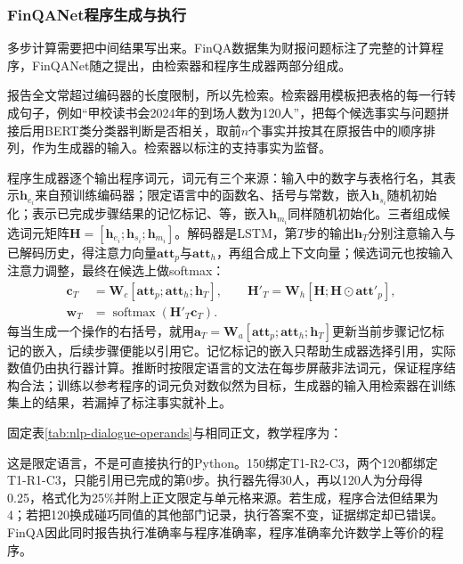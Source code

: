 \subsubsection{FinQANet程序生成与执行}
\label{sec:nlp-dialogue-finqa}

多步计算需要把中间结果写出来。FinQA数据集为财报问题标注了完整的计算程序，FinQANet随之提出，由检索器和程序生成器两部分组成。

报告全文常超过编码器的长度限制，所以先检索。检索器用模板把表格的每一行转成句子，例如“甲校读书会2024年的到场人数为120人”，把每个候选事实与问题拼接后用BERT类分类器判断是否相关，取前$n$个事实并按其在原报告中的顺序排列，作为生成器的输入。检索器以标注的支持事实为监督。

程序生成器逐个输出程序词元，词元有三个来源：输入中的数字与表格行名，其表示$\bm h_{e_i}$来自预训练编码器；限定语言中的函数名、括号与常数，嵌入$\bm h_{s_i}$随机初始化；表示已完成步骤结果的记忆标记、等，嵌入$\bm h_{m_i}$同样随机初始化。三者组成候选词元矩阵$\bm H=[\bm h_{e_i};\bm h_{s_i};\bm h_{m_i}]$。解码器是LSTM，第$T$步的输出$\bm h_T$分别注意输入与已解码历史，得注意力向量$\bm{att}_p$与$\bm{att}_h$，再组合成上下文向量；候选词元也按输入注意力调整，最终在候选上做softmax：
\begin{equation}
\begin{aligned}
  \bm c_T&=\bm W_c[\bm{att}_p;\bm{att}_h;\bm h_T],\qquad
  \bm H'_T=\bm W_h[\bm H;\bm H\odot\bm{att}'_p],\\
  \bm w_T&=\operatorname{softmax}(\bm H'_T\bm c_T).
\end{aligned}
  \label{eq:nlp-dialogue-finqa}
\end{equation}
每当生成一个操作的右括号，就用$\bm a_T=\bm W_a[\bm{att}_p;\bm{att}_h;\bm h_T]$更新当前步骤记忆标记的嵌入，后续步骤便能以引用它。记忆标记的嵌入只帮助生成器选择引用，实际数值仍由执行器计算。推断时按限定语言的文法在每步屏蔽非法词元，保证程序结构合法；训练以参考程序的词元负对数似然为目标，生成器的输入用检索器在训练集上的结果，若漏掉了标注事实就补上。

固定表\ref{tab:nlp-dialogue-operands}与相同正文，教学程序为：
这是限定语言，不是可直接执行的Python。150绑定T1-R2-C3，两个120都绑定T1-R1-C3，只能引用已完成的第0步。执行器先得30人，再以120人为分母得0.25，格式化为25\%并附上正文限定与单元格来源。若生成，程序合法但结果为4；若把120换成碰巧同值的其他部门记录，执行答案不变，证据绑定却已错误。FinQA因此同时报告执行准确率与程序准确率，程序准确率允许数学上等价的程序。


